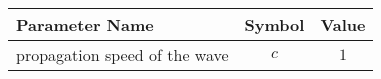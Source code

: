 \begin{tabular}{lcc}
\hline
 Parameter Name                &  Symbol  &  Value  \\
\hline
 propagation speed of the wave &   $c$    &   $1$   \\
\hline
\end{tabular}